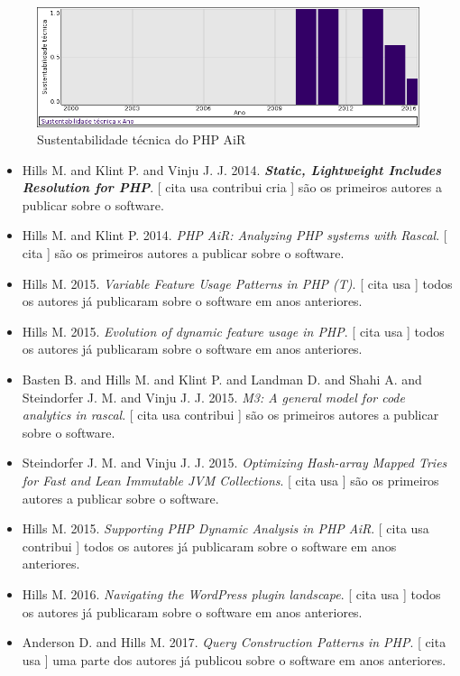 \begin{figure}[h]
  \center
  \includegraphics[scale=0.50]{imagens/softwares-charts/php-air.png}
  \caption{Sustentabilidade técnica do PHP AiR}
\end{figure}


\begin{itemize}
\item Hills M. and Klint P. and Vinju J. J.
      2014.
        \textbf{\textit{ Static, Lightweight Includes Resolution for PHP}}.
      [
          cita
          usa
          contribui
          cria
      ]
são os primeiros autores a publicar sobre o software.
\item Hills M. and Klint P.
      2014.
        \textit{ PHP AiR: Analyzing PHP systems with Rascal}.
      [
          cita
      ]
são os primeiros autores a publicar sobre o software.
\item Hills M.
      2015.
        \textit{ Variable Feature Usage Patterns in PHP (T)}.
      [
          cita
          usa
      ]
todos os autores já publicaram sobre o software em anos anteriores.
\item Hills M.
      2015.
        \textit{ Evolution of dynamic feature usage in PHP}.
      [
          cita
          usa
      ]
todos os autores já publicaram sobre o software em anos anteriores.
\item Basten B. and Hills M. and Klint P. and Landman D. and Shahi A. and Steindorfer J. M. and Vinju J. J.
      2015.
        \textit{ M3: A general model for code analytics in rascal}.
      [
          cita
          usa
          contribui
      ]
são os primeiros autores a publicar sobre o software.
\item Steindorfer J. M. and Vinju J. J.
      2015.
        \textit{ Optimizing Hash-array Mapped Tries for Fast and Lean Immutable JVM Collections}.
      [
          cita
          usa
      ]
são os primeiros autores a publicar sobre o software.
\item Hills M.
      2015.
        \textit{ Supporting PHP Dynamic Analysis in PHP AiR}.
      [
          cita
          usa
          contribui
      ]
todos os autores já publicaram sobre o software em anos anteriores.
\item Hills M.
      2016.
        \textit{ Navigating the WordPress plugin landscape}.
      [
          cita
          usa
      ]
todos os autores já publicaram sobre o software em anos anteriores.
\item Anderson D. and Hills M.
      2017.
        \textit{ Query Construction Patterns in PHP}.
      [
          cita
          usa
      ]
uma parte dos autores já publicou sobre o software em anos anteriores.
\end{itemize}
